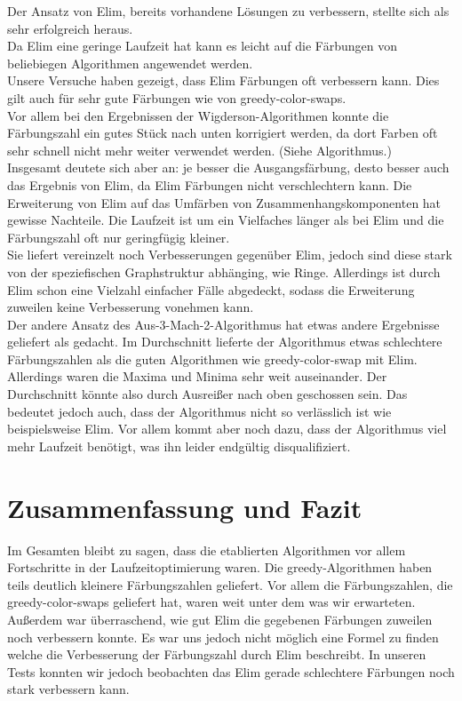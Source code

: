 \documentclass[11pt]{article}
\begin{document}
Der Ansatz von Elim, bereits vorhandene Lösungen zu verbessern, stellte sich als sehr erfolgreich heraus.  \\
Da Elim eine geringe Laufzeit hat kann es leicht auf die Färbungen von beliebiegen Algorithmen angewendet werden. \\
Unsere Versuche haben gezeigt, dass Elim Färbungen oft verbessern kann. Dies gilt auch für sehr gute Färbungen wie von greedy-color-swaps.\\
Vor allem bei den Ergebnissen der Wigderson-Algorithmen konnte die Färbungszahl ein gutes Stück nach unten korrigiert werden, da dort Farben oft sehr schnell nicht mehr weiter verwendet werden. (Siehe Algorithmus.) \\
Insgesamt deutete sich aber an: je besser die Ausgangsfärbung, desto besser auch das Ergebnis von Elim, da Elim Färbungen nicht verschlechtern kann. 
Die Erweiterung von Elim auf das Umfärben von Zusammenhangskomponenten hat gewisse Nachteile. Die Laufzeit ist um ein Vielfaches länger als bei Elim und die Färbungszahl oft nur geringfügig kleiner. \\ %
Sie liefert vereinzelt noch Verbesserungen gegenüber Elim, jedoch sind diese stark von der speziefischen Graphstruktur abhänging, wie Ringe. Allerdings ist durch Elim schon eine Vielzahl einfacher Fälle abgedeckt, sodass die Erweiterung zuweilen keine Verbesserung vonehmen kann. \\
Der andere Ansatz des Aus-3-Mach-2-Algorithmus hat etwas andere Ergebnisse geliefert als gedacht. Im Durchschnitt lieferte der Algorithmus etwas schlechtere Färbungszahlen als die guten Algorithmen wie greedy-color-swap mit Elim.
Allerdings waren die Maxima und Minima sehr weit auseinander. Der Durchschnitt könnte also durch Ausreißer nach oben geschossen sein. 
Das bedeutet jedoch auch, dass der Algorithmus nicht so verlässlich ist wie beispielsweise Elim. Vor allem kommt aber noch dazu, dass der Algorithmus viel mehr Laufzeit benötigt, was ihn leider endgültig disqualifiziert. \\

\section{Zusammenfassung und Fazit} %

Im Gesamten bleibt zu sagen, dass die etablierten Algorithmen vor allem Fortschritte in der Laufzeitoptimierung waren.
Die greedy-Algorithmen haben teils deutlich kleinere Färbungszahlen geliefert. Vor allem die Färbungszahlen, die greedy-color-swaps geliefert hat, waren weit unter dem was wir erwarteten. \\
Außerdem war überraschend, wie gut Elim die gegebenen Färbungen zuweilen noch verbessern konnte. Es war uns jedoch nicht möglich eine Formel zu finden welche die Verbesserung der Färbungszahl durch Elim beschreibt. In unseren Tests konnten wir jedoch beobachten das Elim gerade schlechtere Färbungen noch stark verbessern kann. \\
\end{document}
